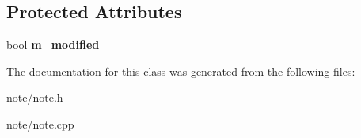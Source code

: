 \subsection*{Protected Attributes}
\begin{DoxyCompactItemize}
\item 
\hypertarget{class_note_a0267f97932e970c23d4bdfad14f6e6bf}{bool {\bfseries m\-\_\-modified}}\label{class_note_a0267f97932e970c23d4bdfad14f6e6bf}

\end{DoxyCompactItemize}


The documentation for this class was generated from the following files\-:\begin{DoxyCompactItemize}
\item 
note/note.\-h\item 
note/note.\-cpp\end{DoxyCompactItemize}
